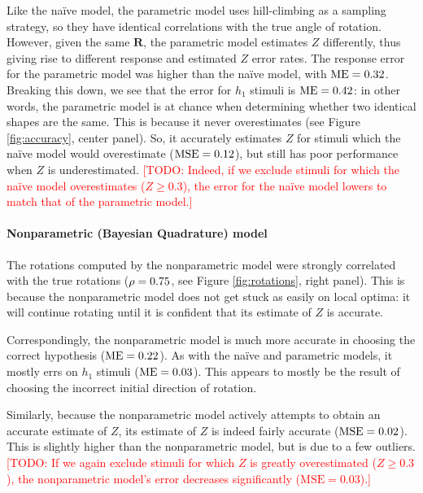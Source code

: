 \documentclass{article} %
\newcommand{\TODO}[1]{\textcolor{red}{[TODO: #1]}}
\newcommand{\MSE}[0]{\mathrm{MSE}}
\newcommand{\naive}[0]{na\"ive}
\begin{document}
Like the \naive{} model, the parametric model uses hill-climbing as a
sampling strategy, so they have identical correlations with the true
angle of rotation. However, given the same $\mathbf{R}$, the
parametric model estimates $Z$ differently, thus giving rise to
different response and estimated $Z$ error rates. The response error
for the parametric model was higher than the \naive{} model, with
$\mathrm{ME}{}=0.32{}$. Breaking this down, we see that the error for $h_1$ stimuli
is $\mathrm{ME}{}=0.42{}$: in other words, the parametric model is at chance
when determining whether two identical shapes are the same. This is
because it never overestimates (see Figure \ref{fig:accuracy}, center
panel). So, it accurately estimates $Z$ for stimuli which the \naive{}
model would overestimate ($\VMMSE{}$), but still has poor performance
when $Z$ is underestimated. \TODO{Indeed, if we exclude stimuli for
  which the \naive{} model overestimates ($Z\geq 0.3$), the error for
  the \naive{} model lowers to match that of the parametric model.}

\paragraph{Nonparametric (Bayesian Quadrature) model}

The rotations computed by the nonparametric model were strongly
correlated with the true rotations ($\rho=0.75$, see Figure
\ref{fig:rotations}, right panel). This is because the nonparametric
model does not get stuck as easily on local optima: it will continue
rotating until it is confident that its estimate of $Z$ is accurate.

Correspondingly, the nonparametric model is much more accurate in
choosing the correct hypothesis ($\mathrm{ME}{}=0.22{}$). As with the \naive{} and
parametric models, it mostly errs on $h_1$ stimuli ($\mathrm{ME}{}=0.03$). This
appears to mostly be the result of choosing the incorrect initial
direction of rotation.

Similarly, because the nonparametric model actively attempts to obtain
an accurate estimate of $Z$, its estimate of $Z$ is indeed fairly
accurate ($\BQMSE{}$). This is slightly higher than the nonparametric
model, but is due to a few outliers. \TODO{If we again exclude stimuli
  for which $Z$ is greatly overestimated ($Z\geq 0.3$), the
  nonparametric model's error decreases significantly
  ($\MSE{}=0.03$).}
\end{document}
